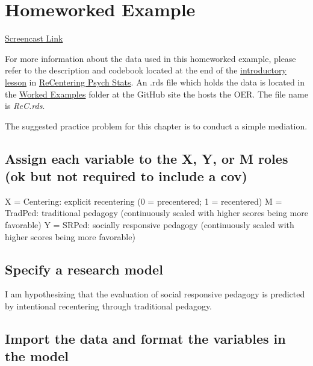 \documentclass[
  11pt,
]{book}
\begin{document}
\hypertarget{homeworked-example-2}{%
\section{Homeworked Example}\label{homeworked-example-2}}

\href{}{Screencast Link}

For more information about the data used in this homeworked example, please refer to the description and codebook located at the end of the \href{https://lhbikos.github.io/ReCenterPsychStats/ReCintro.html\#introduction-to-the-data-set-used-for-homeworked-examples}{introductory lesson} in \href{https://lhbikos.github.io/ReCenterPsychStats/}{ReCentering Psych Stats}. An .rds file which holds the data is located in the \href{https://github.com/lhbikos/ReC_MultivModel/tree/main/Worked_Examples}{Worked Examples} folder at the GitHub site the hosts the OER. The file name is \emph{ReC.rds}.

The suggested practice problem for this chapter is to conduct a simple mediation.

\hypertarget{assign-each-variable-to-the-x-y-or-m-roles-ok-but-not-required-to-include-a-cov}{%
\subsection{Assign each variable to the X, Y, or M roles (ok but not required to include a cov)}\label{assign-each-variable-to-the-x-y-or-m-roles-ok-but-not-required-to-include-a-cov}}

X = Centering: explicit recentering (0 = precentered; 1 = recentered) M = TradPed: traditional pedagogy (continuously scaled with higher scores being more favorable) Y = SRPed: socially responsive pedagogy (continuously scaled with higher scores being more favorable)

\hypertarget{specify-a-research-model-2}{%
\subsection*{Specify a research model}\label{specify-a-research-model-2}}


I am hypothesizing that the evaluation of social responsive pedagogy is predicted by intentional recentering through traditional pedagogy.

\hypertarget{import-the-data-and-format-the-variables-in-the-model}{%
\subsection*{Import the data and format the variables in the model}\label{import-the-data-and-format-the-variables-in-the-model}}
\end{document}
